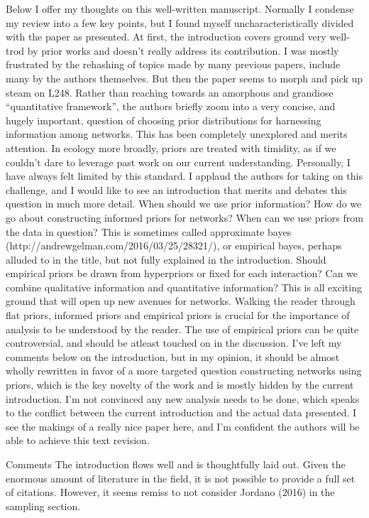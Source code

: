 Below I offer my thoughts on this well-written manuscript. Normally I condense my review into a few key points, but I found myself uncharacteristically divided with the paper as presented. At first, the introduction covers ground very well-trod by prior works and doesn’t really address its contribution. I was mostly frustrated by the rehashing of topics made by many previous papers, include many by the authors themselves. But then the paper seems to morph and pick up steam on L248. Rather than reaching towards an amorphous and grandiose “quantitative framework”, the authors briefly zoom into a very concise, and hugely important, question of choosing prior distributions for harnessing information among networks. This has been completely unexplored and merits attention. In ecology more broadly, priors are treated with timidity, as if we couldn’t dare to leverage past work on our current understanding. Personally, I have always felt limited by this standard. I applaud the authors for taking on this challenge, and I would like to see an introduction that merits and debates this question in much more detail. When should we use prior information? How do we go about constructing informed priors for networks? When can we use priors from the data in question? This is sometimes called approximate bayes (http://andrewgelman.com/2016/03/25/28321/), or empirical bayes, perhaps alluded to in the title, but not fully explained in the introduction. Should empirical priors be drawn from hyperpriors or fixed for each interaction? Can we combine qualitative information and quantitative information? This is all exciting ground that will open up new avenues for networks. Walking the reader through flat priors, informed priors and empirical priors is crucial for the importance of analysis to be understood by the reader. The use of empirical priors can be quite controversial, and should be atleast touched on in the discussion.
I’ve left my comments below on the introduction, but in my opinion, it should be almost wholly rewritten in favor of a more targeted question constructing networks using priors, which is the key novelty of the work and is mostly hidden by the current introduction. I’m not convinced any new analysis needs to be done, which speaks to the conflict between the current introduction and the actual data presented. I see the makings of a really nice paper here, and I’m confident the authors will be able to achieve this text revision.

Comments
The introduction flows well and is thoughtfully laid out. Given the enormous amount of literature in the field, it is not possible to provide a full set of citations. However, it seems remiss to not consider Jordano (2016) in the sampling section.

